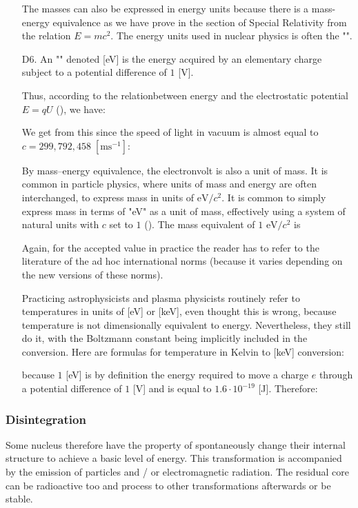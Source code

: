\begin{enumerate}
		The masses can also be expressed in energy units because there is a mass-energy equivalence as we have prove in the section of Special Relativity from the relation $E=mc^2$. The energy units used in nuclear physics is often the "".
	
	  \item[D6.] An "" denoted [eV] is the energy acquired by an elementary charge subject to a potential difference of $1$ [V].
	  
	  Thus, according to the relationbetween energy and the electrostatic potential $E=qU$ (), we have:
	
	We get from this since the speed of light in vacuum is almost equal to $c=299,792,458\;[\text{ms}^{-1}]$:
	
	  
	 By mass–energy equivalence, the electronvolt is also a unit of mass. It is common in particle physics, where units of mass and energy are often interchanged, to express mass in units of $\text{eV}/c^2$. It is common to simply express mass in terms of "eV" as a unit of mass, effectively using a system of natural units with $c$ set to $1$ (). The mass equivalent of $1$ $\text{eV}/c^2$ is
	
	Again, for the accepted value in practice the reader has to refer to the literature of the ad hoc international norms (because it varies depending on the new versions of these norms).
	\begin{tcolorbox}[title=Remark,colframe=black,arc=10pt]
	Practicing astrophysicists and plasma physicists routinely refer to temperatures in units of [eV] or [keV], even thought this is wrong, because temperature is not dimensionally equivalent to energy. Nevertheless, they still do it, with the Boltzmann constant being implicitly included in the conversion. Here are formulas for temperature in Kelvin to [keV] conversion:
	
	because $1$ [eV] is by definition the energy required to move a charge $e$ through a potential difference of $1$ [V] and is equal to $1.6\cdot 10^{-19}$ [J]. Therefore:
	
	\end{tcolorbox}
	\end{enumerate}
	
	\pagebreak
	\subsubsection{Disintegration}
	Some nucleus therefore have the property of spontaneously change their internal structure to achieve a basic level of energy. This transformation is accompanied by the emission of particles and / or electromagnetic radiation. The residual core can be radioactive too and process to other transformations afterwards or be stable.

